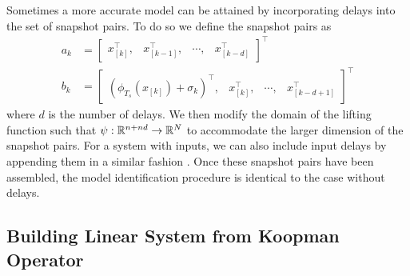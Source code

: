 Sometimes a more accurate model can be attained by incorporating delays into the set of snapshot pairs. To do so we define the snapshot pairs as
\begin{align}
    a_k &= \begin{bmatrix} x_{[k]}^\top, & x_{[k-1]}^\top, & \cdots, & x_{[k-d]}^\top \end{bmatrix}^\top \\
    b_k &= \begin{bmatrix} \left( \phi_{T_s} (x_{[k]}) + \sigma_k \right)^\top, & x_{[k]}^\top, & \cdots, & x_{[k-d+1]}^\top \end{bmatrix}^\top
\end{align}
where $d$ is the number of delays.
We then modify the domain of the lifting function such that $\psi : \mathbb{R}^{n+nd} \to \mathbb{R}^{N}$ to accommodate the larger dimension of the snapshot pairs.
For a system with inputs, we can also include input delays by appending them in a similar fashion .
Once these snapshot pairs have been assembled, the model identification procedure is identical to the case without delays.


\subsection{Building Linear System from Koopman Operator}

